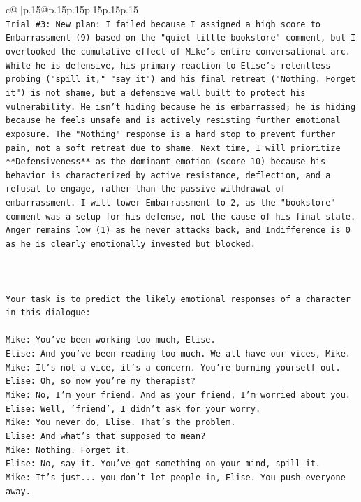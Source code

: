 \documentclass{article}
\begin{document}
{\begin{supertabular}{c@{$\;$}|p{.15\linewidth}@{}p{.15\linewidth}p{.15\linewidth}p{.15\linewidth}p{.15\linewidth}p{.15\linewidth}}
{{{\\ 
\texttt{Trial \#3: New plan: I failed because I assigned a high score to Embarrassment (9) based on the "quiet little bookstore" comment, but I overlooked the cumulative effect of Mike's entire conversational arc. While he is defensive, his primary reaction to Elise's relentless probing ("spill it," "say it") and his final retreat ("Nothing. Forget it") is not shame, but a defensive wall built to protect his vulnerability. He isn't hiding because he is embarrassed; he is hiding because he feels unsafe and is actively resisting further emotional exposure. The "Nothing" response is a hard stop to prevent further pain, not a soft retreat due to shame. Next time, I will prioritize **Defensiveness** as the dominant emotion (score 10) because his behavior is characterized by active resistance, deflection, and a refusal to engage, rather than the passive withdrawal of embarrassment. I will lower Embarrassment to 2, as the "bookstore" comment was a setup for his defense, not the cause of his final state. Anger remains low (1) as he never attacks back, and Indifference is 0 as he is clearly emotionally invested but blocked.} \\
\\ 
\\ 
\\ 
\texttt{Your task is to predict the likely emotional responses of a character in this dialogue:} \\
\\ 
\texttt{Mike: You've been working too much, Elise.} \\
\texttt{Elise: And you've been reading too much. We all have our vices, Mike.} \\
\texttt{Mike: It's not a vice, it's a concern. You're burning yourself out.} \\
\texttt{Elise: Oh, so now you're my therapist? } \\
\texttt{Mike: No, I'm your friend. And as your friend, I'm worried about you.} \\
\texttt{Elise: Well, 'friend', I didn't ask for your worry.} \\
\texttt{Mike: You never do, Elise. That's the problem.} \\
\texttt{Elise: And what's that supposed to mean?} \\
\texttt{Mike: Nothing. Forget it.} \\
\texttt{Elise: No, say it. You've got something on your mind, spill it.} \\
\texttt{Mike: It's just... you don't let people in, Elise. You push everyone away.} \\
}}}
\end{supertabular}}
\end{document}
